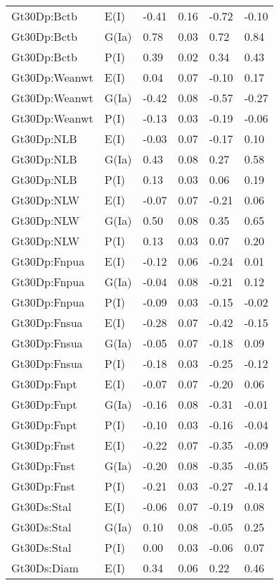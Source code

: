 \begin{center}
\begin{longtable}{|p{1.1in}|p{0.7in}|p{0.7in}|p{0.6in}|p{0.6in}|p{0.6in}|}
  Gt30Dp:Bctb & E(I) & -0.41 & 0.16 & -0.72 & -0.10 \\ 
  Gt30Dp:Bctb & G(Ia) & 0.78 & 0.03 & 0.72 & 0.84 \\ 
  Gt30Dp:Bctb & P(I) & 0.39 & 0.02 & 0.34 & 0.43 \\ 
  Gt30Dp:Weanwt & E(I) & 0.04 & 0.07 & -0.10 & 0.17 \\ 
  Gt30Dp:Weanwt & G(Ia) & -0.42 & 0.08 & -0.57 & -0.27 \\ 
  Gt30Dp:Weanwt & P(I) & -0.13 & 0.03 & -0.19 & -0.06 \\ 
  Gt30Dp:NLB & E(I) & -0.03 & 0.07 & -0.17 & 0.10 \\ 
  Gt30Dp:NLB & G(Ia) & 0.43 & 0.08 & 0.27 & 0.58 \\ 
  Gt30Dp:NLB & P(I) & 0.13 & 0.03 & 0.06 & 0.19 \\ 
  Gt30Dp:NLW & E(I) & -0.07 & 0.07 & -0.21 & 0.06 \\ 
  Gt30Dp:NLW & G(Ia) & 0.50 & 0.08 & 0.35 & 0.65 \\ 
  Gt30Dp:NLW & P(I) & 0.13 & 0.03 & 0.07 & 0.20 \\ 
  Gt30Dp:Fnpua & E(I) & -0.12 & 0.06 & -0.24 & 0.01 \\ 
  Gt30Dp:Fnpua & G(Ia) & -0.04 & 0.08 & -0.21 & 0.12 \\ 
  Gt30Dp:Fnpua & P(I) & -0.09 & 0.03 & -0.15 & -0.02 \\ 
  Gt30Dp:Fnsua & E(I) & -0.28 & 0.07 & -0.42 & -0.15 \\ 
  Gt30Dp:Fnsua & G(Ia) & -0.05 & 0.07 & -0.18 & 0.09 \\ 
  Gt30Dp:Fnsua & P(I) & -0.18 & 0.03 & -0.25 & -0.12 \\ 
  Gt30Dp:Fnpt & E(I) & -0.07 & 0.07 & -0.20 & 0.06 \\ 
  Gt30Dp:Fnpt & G(Ia) & -0.16 & 0.08 & -0.31 & -0.01 \\ 
  Gt30Dp:Fnpt & P(I) & -0.10 & 0.03 & -0.16 & -0.04 \\ 
  Gt30Dp:Fnst & E(I) & -0.22 & 0.07 & -0.35 & -0.09 \\ 
  Gt30Dp:Fnst & G(Ia) & -0.20 & 0.08 & -0.35 & -0.05 \\ 
  Gt30Dp:Fnst & P(I) & -0.21 & 0.03 & -0.27 & -0.14 \\ 
  Gt30Ds:Stal & E(I) & -0.06 & 0.07 & -0.19 & 0.08 \\ 
  Gt30Ds:Stal & G(Ia) & 0.10 & 0.08 & -0.05 & 0.25 \\ 
  Gt30Ds:Stal & P(I) & 0.00 & 0.03 & -0.06 & 0.07 \\ 
  Gt30Ds:Diam & E(I) & 0.34 & 0.06 & 0.22 & 0.46 \\ 

\end{longtable}
\end{center}
